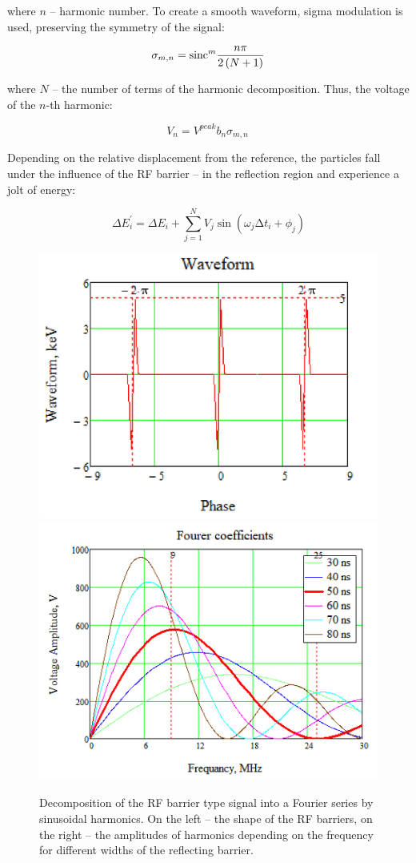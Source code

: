\documentclass[
aps,%
12pt,%
final,%
notitlepage,%
oneside,%
onecolumn,%
nobibnotes,%
nofootinbib,%
superscriptaddress,%
noshowpacs,%
centertags]%
{revtex4}
\begin{document}
\par  where $n$ -- harmonic number. To create a smooth waveform, sigma modulation is used, preserving the symmetry of the signal:

\begin{equation}
\sigma_{m, n}={\rm sinc}^m{\frac{n\pi}{2\left(N+1\right)}}
\label{eq:sigma}
\end{equation}

\par where $N$ -- the number of terms of the harmonic decomposition. Thus, the voltage of the $n$-th harmonic:

\begin{equation}
V_n=V^{peak}b_n\sigma_{m, n}\ 
\label{eq:vn}
\end{equation}

\par Depending on the relative displacement from the reference, the particles fall under the influence of the RF barrier -- in the reflection region and experience a jolt of energy:

\begin{equation}
\Delta E_i^{\prime}=\Delta E_i+\sum_{j=1}^{N} V_j\sin{\left(\omega_j\mathrm{\Delta}t_i+\phi_j\right)}
\label{eq:dE}
\end{equation}

\begin{figure}
\setcaptionmargin{5mm}
   \includegraphics*[width=.49\columnwidth]{img/fig_05-1}
   \includegraphics*[width=.49\columnwidth]{img/fig_05-2}
\caption{Decomposition of the RF barrier type signal into a Fourier series by sinusoidal harmonics. On the left -- the shape of the RF barriers, on the right -- the amplitudes of harmonics depending on the frequency for different widths of the reflecting barrier.}
\label{fig:exp}
\end{figure}
\end{document}
